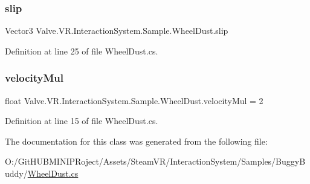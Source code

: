 \subsubsection{\texorpdfstring{slip}{slip}}
{\footnotesize\ttfamily Vector3 Valve.\+V\+R.\+Interaction\+System.\+Sample.\+Wheel\+Dust.\+slip}



Definition at line 25 of file Wheel\+Dust.\+cs.

\mbox{\label{class_valve_1_1_v_r_1_1_interaction_system_1_1_sample_1_1_wheel_dust_a548fed4a360281ab52ded66d85e26149}} 
\subsubsection{\texorpdfstring{velocityMul}{velocityMul}}
{\footnotesize\ttfamily float Valve.\+V\+R.\+Interaction\+System.\+Sample.\+Wheel\+Dust.\+velocity\+Mul = 2}



Definition at line 15 of file Wheel\+Dust.\+cs.



The documentation for this class was generated from the following file\+:\begin{DoxyCompactItemize}
\item 
O\+:/\+Git\+H\+U\+B\+M\+I\+N\+I\+P\+Roject/\+Assets/\+Steam\+V\+R/\+Interaction\+System/\+Samples/\+Buggy\+Buddy/\mbox{\hyperlink{_wheel_dust_8cs}{Wheel\+Dust.\+cs}}\end{DoxyCompactItemize}
